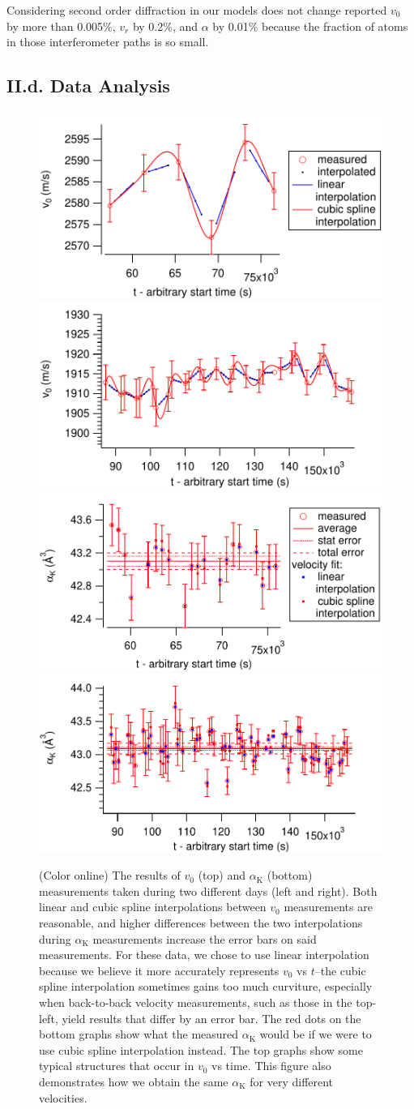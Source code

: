 \documentclass[twocolumn,prl,showpacs,superscriptaddress]{revtex4-1}   %
\newcommand{\ak}{\alpha_{\textrm{K}}}
\begin{document}
Considering second order diffraction in our models does not change reported $v_0$ by more than 0.005\%, $v_r$ by 0.2\%, and $\alpha$ by 0.01\% because the fraction of atoms in those interferometer paths is so small. 

\subsection{II.d. Data Analysis}

\begin{figure}
\includegraphics[width=0.49\linewidth,keepaspectratio]{velVsTime_150212.pdf}
\includegraphics[width=0.49\linewidth,keepaspectratio]{velVsTime_150413.pdf}
\includegraphics[width=0.49\linewidth,keepaspectratio]{polVsTime_150212.pdf}
\includegraphics[width=0.49\linewidth,keepaspectratio]{polVsTime_150413.pdf}
\caption{\label{velPolVsTimeExample}(Color online) The results of $v_0$ (top) and $\ak$ (bottom) measurements taken during two different days (left and right). Both linear and cubic spline interpolations between $v_0$ measurements are reasonable, and higher differences between the two interpolations during $\ak$ measurements increase the error bars on said measurements. For these data, we chose to use linear interpolation because we believe it more accurately represents $v_0$ vs $t$--the cubic spline interpolation sometimes gains too much curviture, especially when back-to-back velocity measurements, such as those in the top-left, yield results that differ by an error bar. The red dots on the bottom graphs show what the measured $\ak$ would be if we were to use cubic spline interpolation instead. The top graphs show some typical structures that occur in $v_0$ vs time. This figure also demonstrates how we obtain the same $\ak$ for very different velocities.}

\end{figure}
\end{document}
